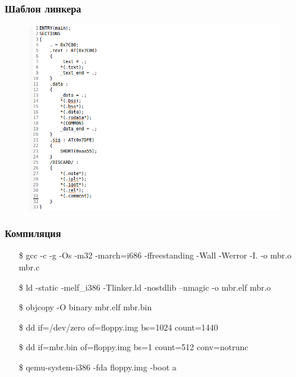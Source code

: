 \documentclass{beamer}
\begin{document}
\begin{frame}
\frametitle{Шаблон линкера}

\begin{figure}
\includegraphics[scale=0.4]{res/linker}
\end{figure}

\end{frame}


\begin{frame}
\frametitle{Компиляция}

\begin{itemize}
\item[\$]gcc -c -g -Os -m32 -march=i686 -ffreestanding -Wall -Werror -I. -o mbr.o mbr.c
\item[\$]ld -static -melf\_i386 -Tlinker.ld -nostdlib --nmagic -o mbr.elf mbr.o
\item[\$]objcopy -O binary mbr.elf mbr.bin
\vspace{3em}
\item[\$]dd if=/dev/zero of=floppy.img bs=1024 count=1440
\item[\$]dd if=mbr.bin of=floppy.img bs=1 count=512 conv=notrunc
\vspace{3em}
\item[\$]qemu-system-i386 -fda floppy.img -boot a
\end{itemize}

\end{frame}

\end{document}
